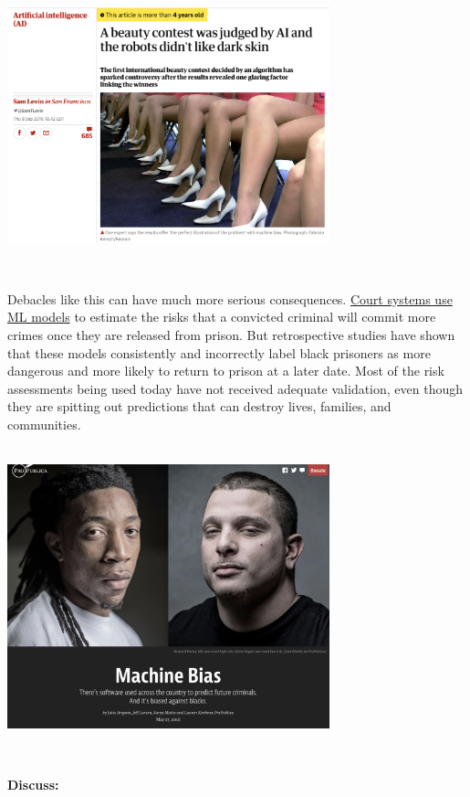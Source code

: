 \documentclass[
]{book}
\begin{document}
~\\

\includegraphics[width=0.7\textwidth,height=\textheight]{img/ethics-machine_bias.png}

~

Debacles like this can have much more serious consequences. \href{https://www.propublica.org/article/machine-bias-risk-assessments-in-criminal-sentencing}{Court systems use ML models} to estimate the risks that a convicted criminal will commit more crimes once they are released from prison. But retrospective studies have shown that these models consistently and incorrectly label black prisoners as more dangerous and more likely to return to prison at a later date. Most of the risk assessments being used today have not received adequate validation, even though they are spitting out predictions that can destroy lives, families, and communities.

~\\

\includegraphics[width=0.7\textwidth,height=\textheight]{img/ethics-2.png}

~

\textbf{Discuss:}
\end{document}
